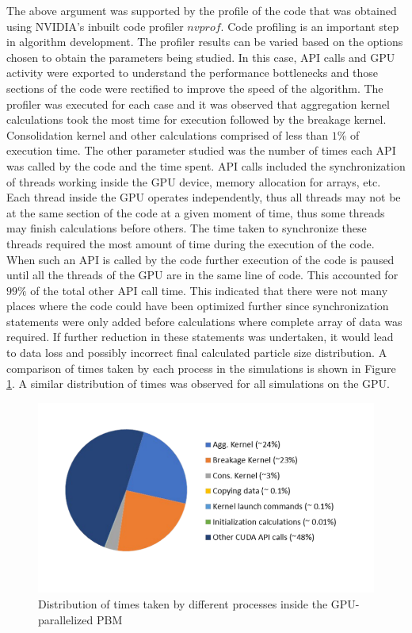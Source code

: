 \documentclass[preprint,10pt,authoryear,review]{elsarticle}
\begin{document}
The above argument was supported by the profile of the code that was obtained using NVIDIA's
inbuilt code profiler $nvprof$. Code profiling is an important step in algorithm development. 
The profiler results can be varied based on the options chosen to obtain the parameters being 
studied. In this case, API calls and GPU activity were exported to understand the performance 
bottlenecks and those sections of the code were rectified to improve the speed of the algorithm.
The profiler was executed for each case and it was observed that aggregation kernel calculations 
took the most time for execution followed by the breakage kernel. Consolidation kernel 
and other calculations comprised of less than $1$\% of execution time. The other parameter 
studied was the number of times each API was called by the code and the time spent. API 
calls included the synchronization of threads working inside the GPU device, memory allocation 
for arrays, etc. Each thread inside the GPU operates independently,
thus all threads may not be at the same section of the code at a given moment of time, 
thus some threads may finish calculations before others. The time taken to synchronize 
these threads required the most amount of time during the execution of the code. When 
such an API is called by the code further execution of the code is paused until all 
the threads of the GPU are in the same line of code. This accounted for $99\%$ of the total  
other API call time. This indicated that there were not many places where the code could 
have been optimized further since synchronization statements were only added before 
calculations where complete array of data was required. 
If further reduction in these statements was undertaken, it would lead to data loss and 
possibly incorrect final calculated particle size distribution. A comparison of times taken 
by each process in the simulations is shown in Figure \ref{fig:res_profile_pie}. A similar 
distribution of times was observed for all simulations on the GPU.

\begin{figure}[h]
\centering
\includegraphics[scale=1]{Profile_Pie.pdf}
\caption{Distribution of times taken by different processes inside the GPU-parallelized 
PBM}
\label{fig:res_profile_pie}
\end{figure}
\end{document}
